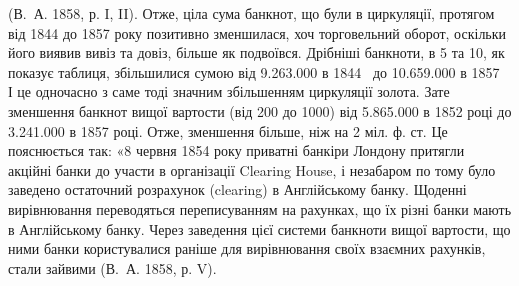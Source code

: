 \noindent{}(В.~А. 1858, р. I, II). Отже, ціла сума банкнот, що були в циркуляції, протягом
від 1844 до 1857 року позитивно зменшилася, хоч торговельний оборот,
оскільки його виявив вивіз та довіз, більше як подвоївся. Дрібніші банкноти,
в 5 та 10, як показує таблиця, збільшилися сумою від \num{9.263.000}
в 1844~ до \num{10.659.000} в 1857~ І це одночасно з саме тоді значним
збільшенням циркуляції золота. Зате зменшення банкнот вищої вартости (від
200 до 1000) від \num{5.865.000} в 1852 році до \num{3.241.000} в
1857 році. Отже, зменшення більше, ніж на 2 міл. ф. ст. Це пояснюється
так: «8 червня 1854 року приватні банкіри Лондону притягли акційні банки
до участи в організації Clearing House, і незабаром по тому було заведено
остаточний розрахунок (clearing) в Англійському банку. Щоденні вирівнювання
переводяться переписуванням на рахунках, що їх різні банки мають в Англійському
банку. Через заведення цієї системи банкноти вищої вартости, що ними
банки користувалися раніше для вирівнювання своїх взаємних рахунків, стали
зайвими (В.~А. 1858, р. V).
